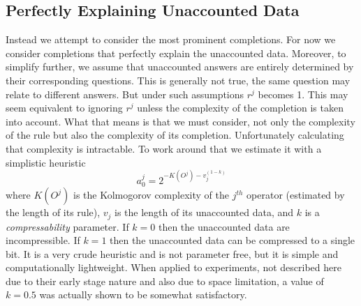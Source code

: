 \documentclass[runningheads]{llncs}
\begin{document}
\subsection{Perfectly Explaining Unaccounted Data}
Instead we attempt to consider the most prominent completions.  For
now we consider completions that perfectly explain the unaccounted
data. Moreover, to simplify further, we assume that unaccounted
answers are entirely determined by their corresponding questions. This
is generally not true, the same question may relate to different
answers. But under such assumptions $r^j$ becomes 1. This may seem
equivalent to ignoring $r^j$ unless the complexity of the completion
is taken into account. What that means is that we must consider, not
only the complexity of the rule but also the complexity of its
completion. Unfortunately calculating that complexity is
intractable. To work around that we estimate it with a simplistic
heuristic
\begin{equation}
a^j_0 = 2^{-K(O^j) - v_j^{(1-k)}}
\end{equation}
where $K(O^j)$ is the Kolmogorov complexity of the $j^{th}$ operator
(estimated by the length of its rule), $v_j$ is the length of its
unaccounted data, and $k$ is a \emph{compressability} parameter. If
$k=0$ then the unaccounted data are incompressible. If $k=1$ then the
unaccounted data can be compressed to a single bit. It is a very crude
heuristic and is not parameter free, but it is simple and
computationally lightweight. When applied to experiments, not
described here due to their early stage nature and also due to space
limitation, a value of $k=0.5$ was actually shown to be somewhat
satisfactory.
\end{document}
